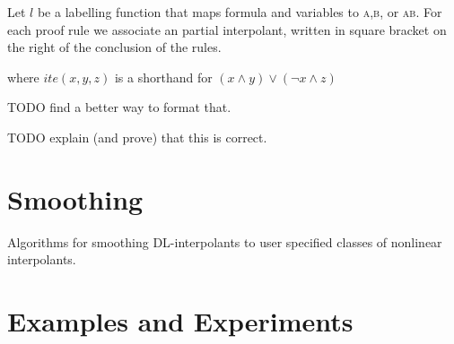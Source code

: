 \documentclass{acm_proc_article-sp}
\begin{document}
Let $l$ be a labelling function that maps formula and variables to \textsc{a},\textsc{b}, or \textsc{ab}.
For each proof rule we associate an partial interpolant, written in square bracket on the right of the conclusion of the rules.


\begin{mathpar}


\end{mathpar}

where $ite(x,y,z)$ is a shorthand for $(x ∧ y)∨(¬x ∧ z)$

TODO find a better way to format that.

TODO explain (and prove) that this is correct.

\section{Smoothing}

Algorithms for smoothing DL-interpolants to user specified classes of nonlinear interpolants. 


\section{Examples and Experiments}
\end{document}
